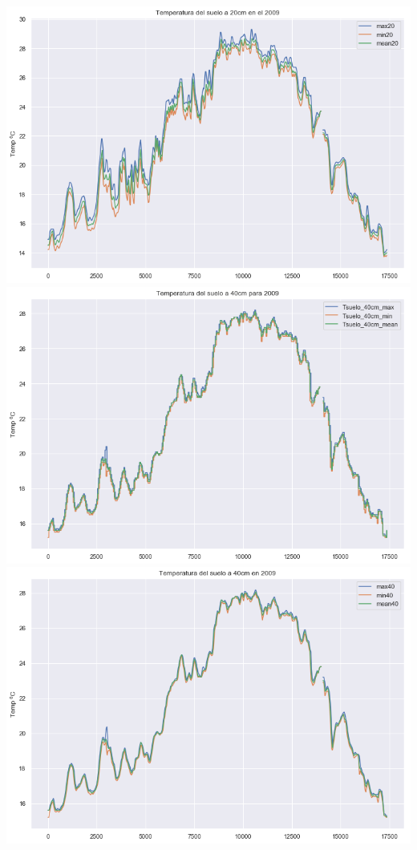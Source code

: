 \documentclass{article}
\begin{document}
\begin{center}
    \includegraphics[scale = 0.3]{TG20S.png}
    \includegraphics[scale = 0.3]{TG40.png}
    \includegraphics[scale = 0.3]{TG40S.png}

\end{center}
\end{document}
